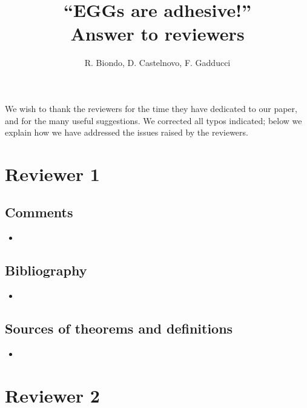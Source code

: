 \documentclass[english,11pt,a4paper]{article}
\title{``EGGs are adhesive!''\\
	Answer to reviewers}
\author{R. Biondo, D. Castelnovo, F. Gadducci}
\begin{document}
	\maketitle
	
	
We wish to thank the reviewers for the time they have dedicated to our paper, and for the many useful suggestions. We corrected all typos indicated; below we explain how we have addressed the issues raised by the reviewers.

\section*{Reviewer 1}
\subsection*{Comments}
\begin{itemize}
\item  
\end{itemize}
\subsection*{Bibliography}
\begin{itemize}
	\item 
\end{itemize}

\subsection*{Sources of theorems and definitions}
\begin{itemize}
	\item 
\end{itemize}


\section*{Reviewer 2}



	
	
\end{document}
